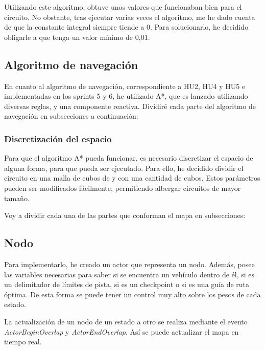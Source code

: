 Utilizando este algoritmo, obtuve unos valores que funcionaban bien para el circuito. No obstante, tras ejecutar varias veces el algoritmo, me he dado cuenta de que la constante integral siempre tiende a 0. Para solucionarlo, he decidido obligarle a que tenga un valor mínimo de 0,01.

\subsection{Algoritmo de navegación}

En cuanto al algoritmo de navegación, correspondiente a HU2, HU4 y HU5 e implementadas en los sprints 5 y 6, he utilizado A*\cite{enwiki:1152315016}, que es lanzado utilizando diversas reglas, y una componente reactiva. Dividiré cada parte del algoritmo de navegación en subsecciones a continuación:

\subsubsection{Discretización del espacio}

Para que el algoritmo A* pueda funcionar, es necesario discretizar el espacio de alguna forma, para que pueda ser ejecutado. Para ello, he decidido dividir el circuito en una malla de cubos de \cubeSize y con una cantidad de \gridSize cubos. Estos parámetros pueden ser modificados fácilmente, permitiendo albergar circuitos de mayor tamaño.

\bigskip

Voy a dividir cada una de las partes que conforman el mapa en subsecciones:

\subsection{Nodo}

Para implementarlo, he creado un actor que representa un nodo. Además, posee las variables necesarias para saber si se encuentra un vehículo dentro de él, si es un delimitador de límites de pista, si es un checkpoint o si es una guía de ruta óptima. De esta forma se puede tener un control muy alto sobre los pesos de cada estado.

\bigskip

La actualización de un nodo de un estado a otro se realiza mediante el evento \textit{ActorBeginOverlap} y \textit{ActorEndOverlap}. Así se puede actualizar el mapa en tiempo real.

